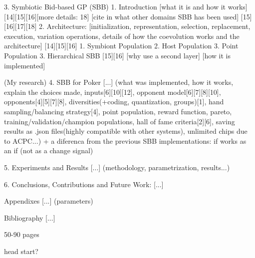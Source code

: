 3. Symbiotic Bid-based GP (SBB)
    1. Introduction
        [what it is and how it works] [14][15][16][more details: 18]
        [cite in what other domains SBB has been used] [15][16][17][18]
    2. Architecture: [initialization, representation, selection, replacement, execution, variation operations, details of how the coevolution works and the architecture] [14][15][16]
        1. Symbiont Population
        2. Host Population
        3. Point Population        
    3. Hierarchical SBB [15][16]
        [why use a second layer]
        [how it is implemented]

(My research)
4. SBB for Poker
[...] (what was implemented, how it works, explain the choices made, inputs[6][10][12], opponent model[6][7][8][10], opponents[4][5][7][8], diversities(+coding, quantization, groups)[1], hand sampling/balancing strategy[4], point population, reward function, pareto, training/validation/champion populations, hall of fame criteria[2][6], saving results as .json files(highly compatible with other systems), unlimited chips due to ACPC...)
+ a diferenca from the previous SBB implementations: if works as an if (not as a change signal)

5. Experiments and Results
[...] (methodology, parametrization, results...)

6. Conclusions, Contributions and Future Work:
[...]

Appendixes
[...] (parameters)

Bibliography
[...]


50-90 pages

head start?


